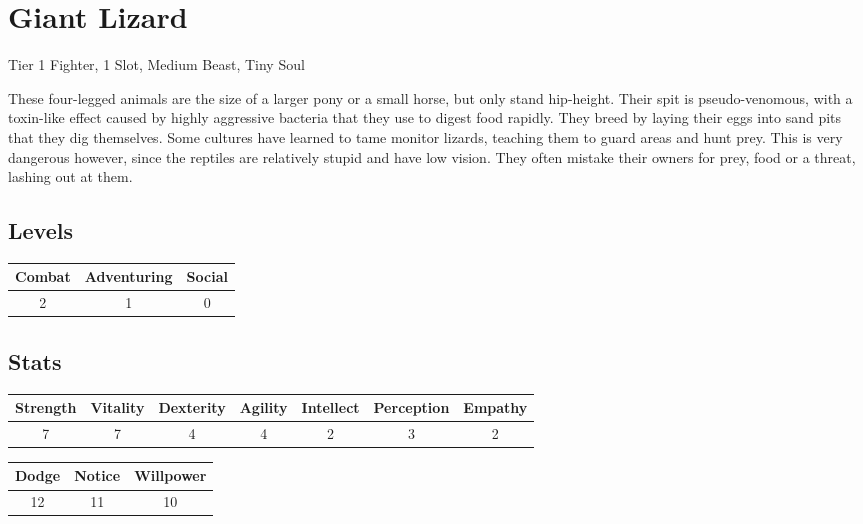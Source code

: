 \section{Giant Lizard}
Tier 1 Fighter, 1 Slot, Medium Beast, Tiny Soul

These four-legged animals are the size of a larger pony or a small horse, but only stand hip-height.
Their spit is pseudo-venomous, with a toxin-like effect caused by highly aggressive bacteria that they use to digest food rapidly.
They breed by laying their eggs into sand pits that they dig themselves.
Some cultures have learned to tame monitor lizards, teaching them to guard areas and hunt prey.
This is very dangerous however, since the reptiles are relatively stupid and have low vision.
They often mistake their owners for prey, food or a threat, lashing out at them.

\subsection{Levels}
\begin{minipage}[H]{1\textwidth}
    \centering
    \begin{tabular}[c]{|c | c | c|}
        \hline
        Combat & Adventuring & Social\\
        \hline
        2 & 1 & 0\\
        \hline
    \end{tabular}
\end{minipage}

\subsection{Stats}
\begin{minipage}[H]{1\textwidth}
    \centering
    \begin{tabular}[c]{|c | c | c | c | c | c | c|}
        \hline
        Strength & Vitality & Dexterity & Agility & Intellect & Perception & Empathy\\
        \hline
        7 & 7 & 4 & 4 & 2 & 3 & 2\\
        \hline
    \end{tabular}
\end{minipage}
\bigbreak

\begin{minipage}[H]{1\textwidth}
    \centering
    \begin{tabular}[c]{|c | c | c|}
        \hline
        Dodge & Notice & Willpower\\
        \hline
        12 & 11 & 10\\
        \hline
    \end{tabular}
\end{minipage}

